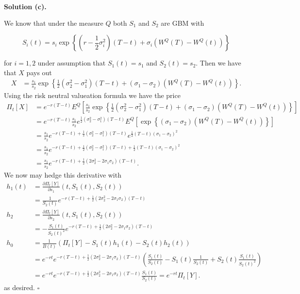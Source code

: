 \documentclass[a4paper,12pt,openany]{book}
\begin{document}
\noindent\makebox[\linewidth]{\rule{\textwidth}{0.4pt}}

\textbf{Solution (c).}

We know that under the measure \(Q\) both \(S_1\) and \(S_2\) are GBM with

\[
S_i(t)=s_i\exp\left\{\left(r-\frac{1}{2}\sigma_i^2\right)(T-t)+\sigma_i (W^Q(T)-W^Q(t))\right\}
\]

for \(i=1,2\) under assumption that \(S_1(t)=s_1\) and \(S_2(t)=s_2\). Then we have that \(X\) pays out
\begin{align*}
X&=\frac{s_1}{s_2}\exp\left\{\frac{1}{2}\left(\sigma_2^2-\sigma_1^2\right)(T-t)+(\sigma_1-\sigma_2) (W^Q(T)-W^Q(t))\right\}.
\end{align*}
Using the risk neutral valueation formula we have the price
\begin{align*}
\Pi_t[X]&=e^{-r(T-t)}E^Q\left[\frac{s_1}{s_2}\exp\left\{\frac{1}{2}\left(\sigma_2^2-\sigma_1^2\right)(T-t)+(\sigma_1-\sigma_2) (W^Q(T)-W^Q(t))\right\}\right]\\
&=e^{-r(T-t)}\frac{s_1}{s_2}e^{\frac{1}{2}\left(\sigma_2^2-\sigma_1^2\right)(T-t)}E^Q\left[\exp\left\{(\sigma_1-\sigma_2) (W^Q(T)-W^Q(t))\right\}\right]\\
&=\frac{s_1}{s_2}e^{-r(T-t)+\frac{1}{2}\left(\sigma_2^2-\sigma_1^2\right)(T-t)}e^{\frac{1}{2}(T-t)(\sigma_1-\sigma_2)^2}\\
&=\frac{s_1}{s_2}e^{-r(T-t)+\frac{1}{2}\left(\sigma_2^2-\sigma_1^2\right)(T-t)+\frac{1}{2}(T-t)(\sigma_1-\sigma_2)^2}\\
&=\frac{s_1}{s_2}e^{-r(T-t)+\frac{1}{2}\left(2\sigma_2^2-2\sigma_1\sigma_2\right)(T-t)}.
\end{align*}
We now may hedge this derivative with
\begin{align*}
h_1(t)&=\frac{\partial \Pi_t[Y]}{\partial s_1}(t,S_1(t),S_2(t))\\
&=\frac{1}{S_2(t)}e^{-r(T-t)+\frac{1}{2}\left(2\sigma_2^2-2\sigma_1\sigma_2\right)(T-t)}\\
h_2&=\frac{\partial \Pi_t[Y]}{\partial s_2}(t,S_1(t),S_2(t))\\
&=-\frac{S_1(t)}{S_2(t)^2}e^{-r(T-t)+\frac{1}{2}\left(2\sigma_2^2-2\sigma_1\sigma_2\right)(T-t)}\\
h_0&=\frac{1}{B(t)}\left(\Pi_t[Y]-S_1(t)h_1(t)-S_2(t)h_2(t)\right)\\
&=e^{-rt}e^{-r(T-t)+\frac{1}{2}\left(2\sigma_2^2-2\sigma_1\sigma_2\right)(T-t)}\left(\frac{S_1(t)}{S_2(t)}-S_1(t)\frac{1}{S_2(t)}+S_2(t)\frac{S_1(t)}{S_2(t)^2}\right)\\
&=e^{-rt}e^{-r(T-t)+\frac{1}{2}\left(2\sigma_2^2-2\sigma_1\sigma_2\right)(T-t)}\frac{S_1(t)}{S_2(t)}=e^{-rt}\Pi_t[Y].
\end{align*}
as desired. \(\square\)
\end{document}
